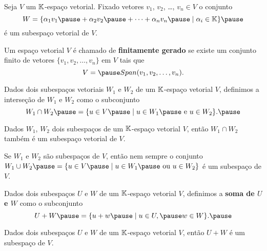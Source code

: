 \documentclass{beamer}
\begin{document}
\begin{frame}
	\begin{proposicao}
		Seja $V$ um $\mathbb{K}$-espaço vetorial. \pause Fixado vetores $v_1$, $v_2$, \dots, $v_n \in V$ \pause o conjunto
		\[
			W = \{\alpha_1v_1 \pause + \alpha_2v_2 \pause + \cdots + \alpha_nv_n \pause \mid \alpha_i \in \cp{K}\}\pause
		\]
		é um subespaço vetorial de $V$.
	\end{proposicao}
\end{frame}

\begin{frame}
	\begin{definicao}
		Um espaço vetorial $V$ é chamado de \textbf{finitamente gerado} \pause se existe um conjunto finito \pause de vetores $\{v_1, v_2, \dots, v_n\}$ em $V$ \pause tais que\pause
		\[
			V = \pause Span(v_1, v_2, \dots, v_n).
		\]
	\end{definicao}
\end{frame}

\begin{frame}
	\begin{definicao}
		Dados dois subespaços vetoriais $W_1$ \pause e $W_2$ \pause de um $\mathbb{K}$-espaço vetorial $V$, \pause definimos a interseção de $W_1$ e $W_2$ \pause como o subconjunto
		\[
			W_1 \cap W_2 \pause = \{u \in V \pause \mid u\in W_1\pause \mbox{ e } u \in W_2\}.\pause
		\]	
	\end{definicao}
	
	\vspace{1cm}
	
	\begin{teorema}
		Dados $W_1$, $W_2$ dois subespaços de um $\mathbb{K}$-espaço vetorial $V$, \pause então $W_1 \cap W_2$ também é um subespaço vetorial de $V$.
	\end{teorema}
\end{frame}

\begin{frame}
	\begin{observacao}
		Se $W_1$ e $W_2$ são subespaços de $V$, \pause então nem sempre o conjunto $W_1 \cup W_2 \pause = \{u \in V \pause \mid u \in W_1 \pause \mbox{ ou } u \in W_2\}$ \pause é um subespaço de $V$.
	\end{observacao}
\end{frame}

\begin{frame}
	\begin{definicao}
		Dados dois subespaços $U$ e $W$ \pause de um $\mathbb{K}$-espaço vetorial $V$, \pause definimos a \textbf{soma de $U$ e $W$} \pause como o subconjunto
		\[
			U + W \pause = \{u + w \pause \mid u \in U, \pause w \in W\}.\pause
		\]
	\end{definicao}
	
	\vspace*{1cm}
	
	\begin{teorema}
		Dados dois subespaços $U$ e $W$ de um $\mathbb{K}$-espaço vetorial $V$, \pause então $U + W$ é um subespaço de $V$.
	\end{teorema}
\end{frame}
\end{document}
